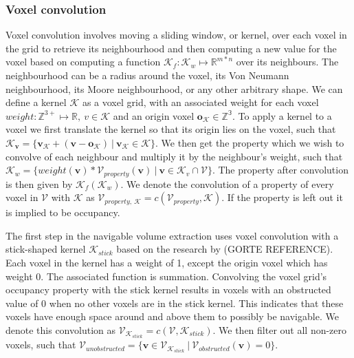 \documentclass{article}
\begin{document}
\subsubsection{Voxel convolution}
Voxel convolution involves moving a sliding window, or kernel, over each voxel in the grid to retrieve its neighbourhood and then computing a new value for the voxel based on computing a function \(\mathcal{K}_f: \mathcal{K}_w \mapsto \mathbb{R}^{m*n}\) over its neighbours. The neighbourhood can be a radius around the voxel, its Von Neumann neighbourhood, its Moore neighbourhood, or any other arbitrary shape. We can define a kernel \(\mathcal{K}\) as a voxel grid, with an associated weight for each voxel \(weight: \mathbb{Z}^{3+} \mapsto \mathbb{R},\ v \in {\mathcal{K}}\) and an origin voxel \(\boldsymbol{o_{\mathcal{K}}} \in \mathbb{Z^{3}}\). To apply a kernel to a voxel we first translate the kernel so that its origin lies on the voxel, such that \(\mathcal{K}_{\boldsymbol{v}} = \{\boldsymbol{v_{\mathcal{K}}} + (\boldsymbol{v} - \boldsymbol{o_{\mathcal{K}}})\ |\ \boldsymbol{v_{\mathcal{K}}} \in \mathcal{K}\}\). We then get the property which we wish to convolve of each neighbour and multiply it by the neighbour's weight, such that \(\mathcal{K}_{w} = \{weight(\boldsymbol{v}) * \mathcal{V}_{property}(\boldsymbol{v})\ |\ \boldsymbol{v} \in \mathcal{K}_{v} \cap \mathcal{V}\}\). The property after convolution is then given by \(\mathcal{K}_f(\mathcal{K}_{w})\). We denote the convolution of a property of every voxel in \(\mathcal{V}\) with \(\mathcal{K}\) as \(\mathcal{V}_{property,\  \mathcal{K}} = c(\mathcal{V}_{property},\mathcal{K})\). If the property is left out it is implied to be occupancy.

The first step in the navigable volume extraction uses voxel convolution with a stick-shaped kernel \(\mathcal{K}_{stick}\) based on the research by (GORTE REFERENCE). Each voxel in the kernel has a weight of 1, except the origin voxel which has weight 0. The associated function is summation. Convolving the voxel grid's occupancy property with the stick kernel results in voxels with an obstructed value of 0 when no other voxels are in the stick kernel. This indicates that these voxels have enough space around and above them to possibly be navigable. We denote this convolution as \(\mathcal{V}_{\mathcal{K}_{stick}} = c(\mathcal{V},\mathcal{K}_{stick})\). We then filter out all non-zero voxels, such that \(\mathcal{V}_{unobstructed}=\{\boldsymbol{v} \in \mathcal{V}_{\mathcal{K}_{stick}}\ |\ \mathcal{V}_{obstructed}(\boldsymbol{v}) = 0\}\). 
\end{document}
